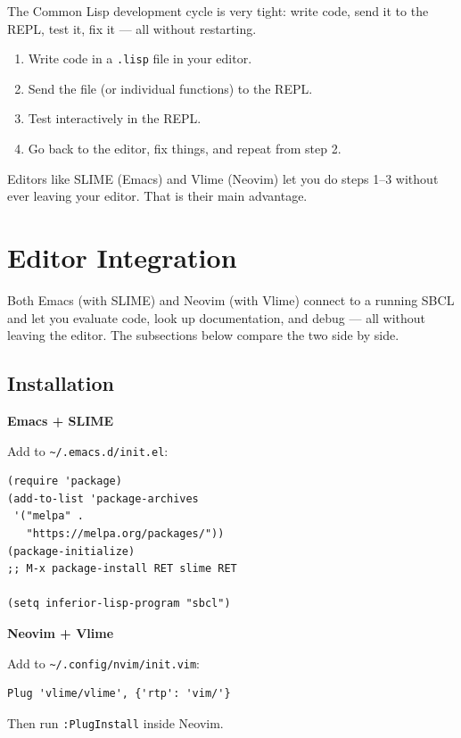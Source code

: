 \documentclass[a4paper,11pt]{article}
\newcommand{\file}[1]{\texttt{#1}}
\newlength{\colwidth}
\newcommand{\colheader}[1]{\textbf{\large #1}\par\medskip}
\begin{document}
The Common Lisp development cycle is very tight:
write code, send it to the REPL, test it, fix it --- all without restarting.

\begin{enumerate}
  \item Write code in a \file{.lisp} file in your editor.
  \item Send the file (or individual functions) to the REPL.
  \item Test interactively in the REPL.
  \item Go back to the editor, fix things, and repeat from step 2.
\end{enumerate}

Editors like SLIME (Emacs) and Vlime (Neovim) let you do steps 1--3
without ever leaving your editor. That is their main advantage.

\section{Editor Integration}

Both Emacs (with SLIME) and Neovim (with Vlime) connect to a running SBCL
and let you evaluate code, look up documentation, and debug --- all without
leaving the editor. The subsections below compare the two side by side.

\subsection{Installation}

\noindent
\begin{minipage}[t]{\colwidth}
  \colheader{Emacs + SLIME}
  Add to \file{\textasciitilde/.emacs.d/init.el}:
\begin{lstlisting}[style=shell,style=narrow]
(require 'package)
(add-to-list 'package-archives
 '("melpa" .
   "https://melpa.org/packages/"))
(package-initialize)
;; M-x package-install RET slime RET

(setq inferior-lisp-program "sbcl")
\end{lstlisting}
\end{minipage}\hfill
\begin{minipage}[t]{\colwidth}
  \colheader{Neovim + Vlime}
  Add to \file{\textasciitilde/.config/nvim/init.vim}:
\begin{lstlisting}[style=shell,style=narrow]
Plug 'vlime/vlime', {'rtp': 'vim/'}
\end{lstlisting}
  Then run \texttt{:PlugInstall} inside Neovim.
\end{minipage}
\end{document}
